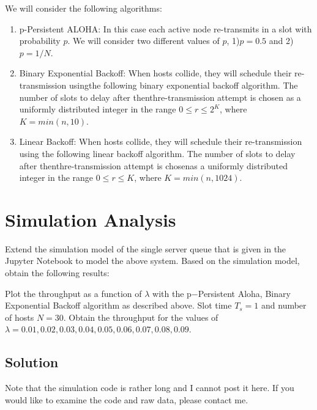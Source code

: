 \documentclass{article}
\begin{document}
We will consider the following algorithms:

\begin{enumerate}
    \item p-Persistent ALOHA: In this case each active node re-transmits in a slot with probability $p$.
          We will consider two different values of $p$, 1)$p= 0.5$ and 2)$p=1/N$.
    \item Binary Exponential Backoff: When hosts collide, they will schedule their re-transmission usingthe following binary exponential backoff algorithm.
          The number of slots to delay after thenthre-transmission attempt is chosen as a uniformly distributed integer in the range $0 \le r \le 2^K$, where $K= min(n,10)$.
    \item Linear Backoff: When hosts collide, they will schedule their re-transmission using the following linear backoff algorithm.
          The number of slots to delay after thenthre-transmission attempt is chosenas a uniformly distributed integer in the range $0 \le r \le K$, where $K= min(n,1024)$.
\end{enumerate}

\section{Simulation Analysis}
Extend the simulation model of the single server queue that is given in the Jupyter Notebook to model the above system.
Based on the simulation model, obtain the following results:

Plot  the  throughput  as  a  function  of $\lambda$ with  the p−Persistent  Aloha,  Binary  Exponential  Backoff algorithm as described above.
Slot time $T_s= 1$ and number of hosts $N = 30$.
Obtain the throughput for the values of $\lambda = 0.01,0.02,0.03,0.04,0.05,0.06,0.07,0.08,0.09$.

\subsection*{Solution}

Note that the simulation code is rather long and I cannot post it here.
If you would like to examine the code and raw data, please contact me.
\end{document}
